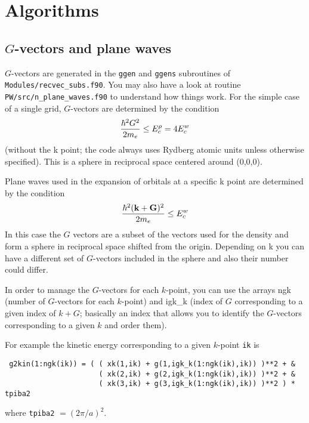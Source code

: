 \documentclass[12pt,a4paper]{article}
\begin{document}

\section{Algorithms}

\subsection{$G$-vectors and plane waves}

$G$-vectors are generated in the \texttt{ggen} and \texttt{ggens}
subroutines of \texttt{Modules/recvec\_subs.f90}. You may also have
a look at routine \texttt{PW/src/n\_plane\_waves.f90} to understand
how things work. For the simple case of a single grid,
$G$-vectors are determined by the condition
\begin{equation}
  { \hbar^2 G^2 \over 2m_e} \le E^\rho_c = 4 E^w_c
\end{equation}
(without the k point; the code always uses Rydberg atomic units unless
otherwise specified). This is a sphere in reciprocal space centered
around (0,0,0).

Plane waves used in the expansion of orbitals at a specific k point
are determined by the condition
\begin{equation}
  { \hbar^2 ({\bf k}+{\bf G})^2 \over 2m_e} \le E^w_c
\end{equation}
In this case the $G$ vectors are a subset of the vectors used for the
density and form a sphere in reciprocal space shifted from the origin.
Depending on k you can have a different set of $G$-vectors included
in the sphere and also their number could differ.

In order to manage the $G$-vectors for each $k$-point, you can use the arrays
ngk (number of $G$-vectors for each $k$-point) and igk\_k (index of $G$
corresponding to a given index of $k+G$; basically an index that allows
you to identify the $G$-vectors corresponding to a given $k$ and order them).

For example the kinetic energy corresponding to a given $k$-point \texttt{ik}
is
\begin{verbatim}
 g2kin(1:ngk(ik)) = ( ( xk(1,ik) + g(1,igk_k(1:ngk(ik),ik)) )**2 + &
                      ( xk(2,ik) + g(2,igk_k(1:ngk(ik),ik)) )**2 + &
                      ( xk(3,ik) + g(3,igk_k(1:ngk(ik),ik)) )**2 ) * tpiba2
\end{verbatim}
where \texttt{tpiba2} $= (2\pi/a)^2$.
\end{document}

